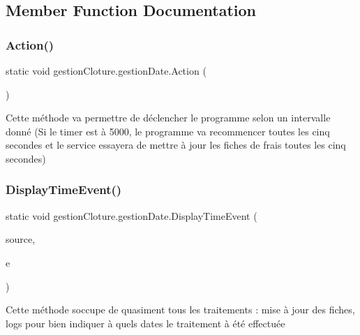 \subsection{Member Function Documentation}
\mbox{\label{classgestion_cloture_1_1gestion_date_a6fd73af56600e9fb9940729449e8af4f}} 
\subsubsection{\texorpdfstring{Action()}{Action()}}
{\footnotesize\ttfamily static void gestion\+Cloture.\+gestion\+Date.\+Action (\begin{DoxyParamCaption}{ }\end{DoxyParamCaption})\hspace{0.3cm}{\ttfamily [static]}}

Cette méthode va permettre de déclencher le programme selon un intervalle donné (Si le timer est à 5000, le programme va recommencer toutes les cinq secondes et le service essayera de mettre à jour les fiches de frais toutes les cinq secondes) \mbox{\label{classgestion_cloture_1_1gestion_date_a6646013d65b640490269556de333607c}} 
\subsubsection{\texorpdfstring{Display\+Time\+Event()}{DisplayTimeEvent()}}
{\footnotesize\ttfamily static void gestion\+Cloture.\+gestion\+Date.\+Display\+Time\+Event (\begin{DoxyParamCaption}\item[{object}]{source,  }\item[{Elapsed\+Event\+Args}]{e }\end{DoxyParamCaption})\hspace{0.3cm}{\ttfamily [static]}}

Cette méthode s\textquotesingle{}occupe de quasiment tous les traitements \+: mise à jour des fiches, logs pour bien indiquer à quels dates le traitement à été effectuée \mbox{\label{classgestion_cloture_1_1gestion_date_a9ee14a2e60b68ffedad925b42a0ad090}} 
